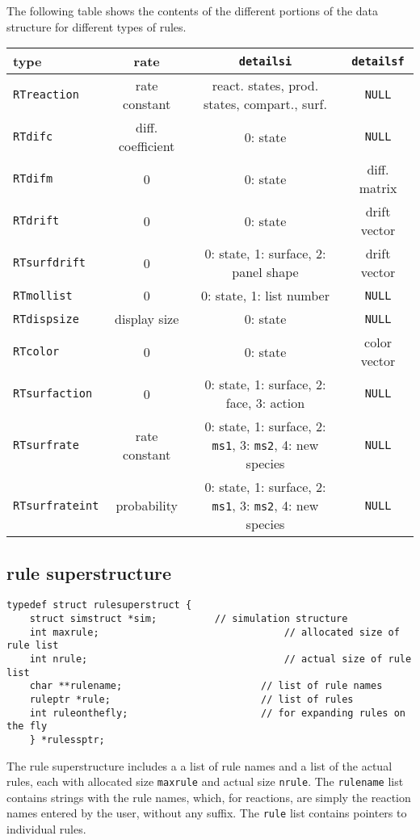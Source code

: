 \documentclass {book}
\begin{document}
The following table shows the contents of the different portions of the data structure for different types of rules.

\begin{longtable}[c]{lccc}
type&rate&\texttt{detailsi}&\texttt{detailsf}\\
\hline
\texttt{RTreaction}&rate constant&react. states, prod. states, compart., surf.&\texttt{NULL}\\
\texttt{RTdifc}&diff. coefficient&0: state&\texttt{NULL}\\
\texttt{RTdifm}&0&0: state&diff. matrix\\
\texttt{RTdrift}&0&0: state&drift vector\\
\texttt{RTsurfdrift}&0&0: state, 1: surface, 2: panel shape&drift vector\\
\texttt{RTmollist}&0&0: state, 1: list number&\texttt{NULL}\\
\texttt{RTdispsize}&display size&0: state&\texttt{NULL}\\
\texttt{RTcolor}&0&0: state&color vector\\
\texttt{RTsurfaction}&0&0: state, 1: surface, 2: face, 3: action&\texttt{NULL}\\
\texttt{RTsurfrate}&rate constant&0: state, 1: surface, 2: \texttt{ms1}, 3: \texttt{ms2}, 4: new species&\texttt{NULL}\\
\texttt{RTsurfrateint}&probability&0: state, 1: surface, 2: \texttt{ms1}, 3: \texttt{ms2}, 4: new species&\texttt{NULL}\\

\end{longtable}


\subsection*{rule superstructure}

\begin{lstlisting}
typedef struct rulesuperstruct {
	struct simstruct *sim;			// simulation structure
	int maxrule;								// allocated size of rule list
	int nrule;									// actual size of rule list
	char **rulename;						// list of rule names
	ruleptr *rule;							// list of rules
	int ruleonthefly;						// for expanding rules on the fly
	} *rulessptr;
\end{lstlisting}

The rule superstructure includes a a list of rule names and a list of the actual rules, each with allocated size \texttt{maxrule} and actual size \texttt{nrule}. The \texttt{rulename} list contains strings with the rule names, which, for reactions, are simply the reaction names entered by the user, without any suffix. The \texttt{rule} list contains pointers to individual rules.
\end{document}
